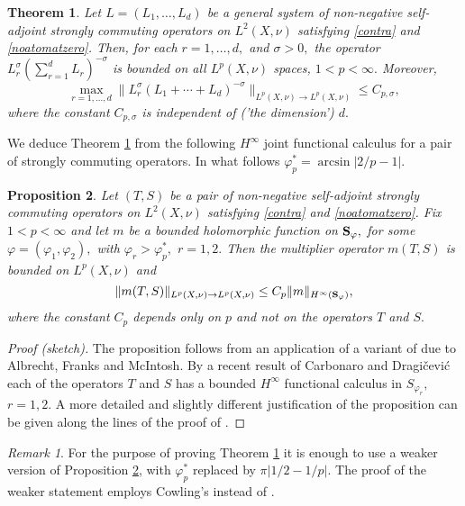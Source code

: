 \documentclass[leqno,12pt]{amsart}
\newtheorem{thm}{Theorem}[section]
\newtheorem{pro}[thm]{Proposition}
\theoremstyle{definition}
\theoremstyle{remark}
\newtheorem*{remark}{Remark}
\begin{document}
        \begin{thm}
         \label{thm:genRiesz} Let $L=(L_1,\ldots,L_d)$ be a general system of non-negative self-adjoint strongly commuting operators on $L^2(X,\nu)$ satisfying \eqref{contra} and \eqref{noatomatzero}. Then, for each $r=1,\ldots,d,$ and $\sigma>0,$ the operator $L_r^{\sigma}(\sum_{r=1}^d L_r)^{-\sigma}$ is bounded on all $L^p(X,\nu)$ spaces, $1<p<\infty.$ Moreover,
         \begin{equation}
         \label{eq:thm:genRiesz}
         \max_{r=1,...,d}\|L_r^{\sigma}(L_1+\cdots+L_d)^{-\sigma}\|_{L^p(X,\nu)\to L^p(X,\nu)}\leq C_{p,\sigma},
         \end{equation}
         where the constant $C_{p,\sigma}$ is independent of ('the dimension') $d.$
         \end{thm}
         We deduce Theorem \ref{thm:genRiesz} from the following $H^{\infty}$ joint functional calculus for a pair of strongly commuting operators. In what follows ${\varphi_p^*}=\arcsin|2/p-1|.$
         \begin{pro}
         \label{cor:genMarHinfdimindep}
         Let $(T,S)$ be a pair of non-negative self-adjoint strongly commuting operators on $L^2(X,\nu)$ satisfying \eqref{contra} and \eqref{noatomatzero}. Fix $1<p<\infty$ and let $m$ be a bounded holomorphic function on ${\bf S}_{\varphi},$ for some $\varphi=(\varphi_1,\varphi_2),$ with $\varphi_r>{\varphi_p^*},$ $r=1,2.$ Then the multiplier operator $m(T,S)$ is bounded on $L^p(X,\nu)$ and
         \begin{equation}
         \label{eq:dimindepineq}
         \|m(T,S)\|_{L^p(X,\nu)\to L^p(X,\nu)}\leq C_p\|m\|_{H^{\infty}({\bf S}_{\varphi})},
         \end{equation}
         where the constant $C_p$ depends only on $p$ and not on the operators $T$ and $S.$
         \end{pro}
         \begin{proof}[Proof (sketch)]
         
         The proposition follows from an application of a variant of \cite[Theorem 5.4]{AlFrMc} due to Albrecht, Franks and McIntosh. By a recent result of Carbonaro and Dragi\v{c}evi\'{c} \cite[Theorem 1]{Carb-Drag} each of the operators $T$ and $S$ has a bounded $H^{\infty}$ functional calculus in $S_{\varphi_r},$ $r=1,2.$ A more detailed and slightly different justification of the proposition can be given along the lines of the proof of \cite[Corollary 4.1.2]{PhD}.
         \end{proof}
         \begin{remark}
         For the purpose of proving Theorem \ref{thm:genRiesz} it is enough to use a weaker version of Proposition \ref{cor:genMarHinfdimindep}, with ${\varphi_p^*}$ replaced by $\pi|1/2-1/p|.$ The proof of the weaker statement employs Cowling's \cite[Theorem 3]{Hanonsemi} instead of \cite[Theorem 1]{Carb-Drag}.
         \end{remark}
\end{document}

